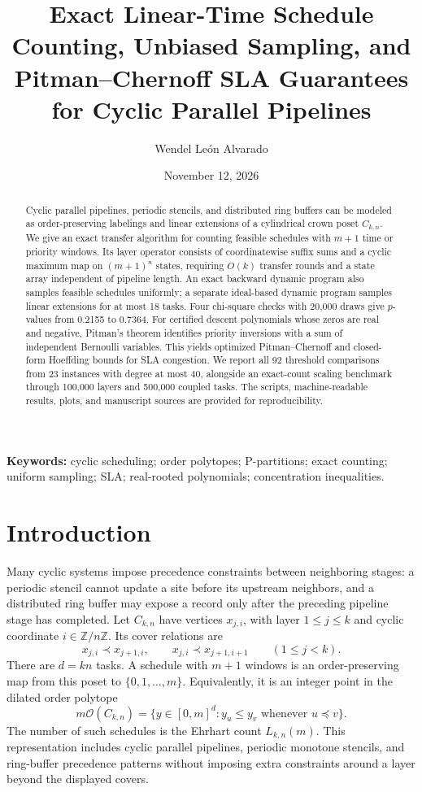 \documentclass[10pt]{article}
\title{Exact Linear-Time Schedule Counting, Unbiased Sampling, and Pitman--Chernoff SLA Guarantees for Cyclic Parallel Pipelines}
\author{Wendel León Alvarado}
\date{November 12, 2026}
\newcommand{\Ocal}{\mathcal{O}}
\begin{document}
\maketitle

\begin{abstract}
Cyclic parallel pipelines, periodic stencils, and distributed ring buffers can be modeled as order-preserving labelings and linear extensions of a cylindrical crown poset $C_{k,n}$. We give an exact transfer algorithm for counting feasible schedules with $m+1$ time or priority windows. Its layer operator consists of coordinatewise suffix sums and a cyclic maximum map on $(m+1)^n$ states, requiring $O(k)$ transfer rounds and a state array independent of pipeline length. An exact backward dynamic program also samples feasible schedules uniformly; a separate ideal-based dynamic program samples linear extensions for at most 18 tasks. Four chi-square checks with 20,000 draws give $p$-values from 0.2155 to 0.7364. For certified descent polynomials whose zeros are real and negative, Pitman's theorem identifies priority inversions with a sum of independent Bernoulli variables. This yields optimized Pitman--Chernoff and closed-form Hoeffding bounds for SLA congestion. We report all 92 threshold comparisons from 23 instances with degree at most 40, alongside an exact-count scaling benchmark through 100,000 layers and 500,000 coupled tasks. The scripts, machine-readable results, plots, and manuscript sources are provided for reproducibility.
\end{abstract}

\noindent\textbf{Keywords:} cyclic scheduling; order polytopes; P-partitions; exact counting; uniform sampling; SLA; real-rooted polynomials; concentration inequalities.

\section{Introduction}

Many cyclic systems impose precedence constraints between neighboring stages: a periodic stencil cannot update a site before its upstream neighbors, and a distributed ring buffer may expose a record only after the preceding pipeline stage has completed. Let $C_{k,n}$ have vertices $x_{j,i}$, with layer $1\le j\le k$ and cyclic coordinate $i\in\mathbb{Z}/n\mathbb{Z}$. Its cover relations are
\[
  x_{j,i}\prec x_{j+1,i},\qquad
  x_{j,i}\prec x_{j+1,i+1}\qquad (1\le j<k).
\]
There are $d=kn$ tasks. A schedule with $m+1$ windows is an order-preserving map from this poset to $\{0,1,\ldots,m\}$. Equivalently, it is an integer point in the dilated order polytope
\[
  m\Ocal(C_{k,n})
  =\{y\in[0,m]^d:y_u\le y_v\text{ whenever }u\preceq v\}.
\]
The number of such schedules is the Ehrhart count $L_{k,n}(m)$. This representation includes cyclic parallel pipelines, periodic monotone stencils, and ring-buffer precedence patterns without imposing extra constraints around a layer beyond the displayed covers.
\end{document}
